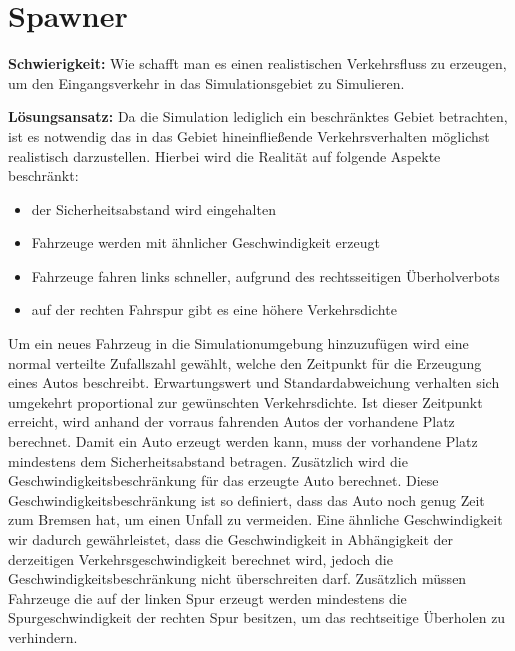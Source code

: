 \section{Spawner}
\textbf{Schwierigkeit:} Wie schafft man es einen realistischen Verkehrsfluss zu erzeugen, um den Eingangsverkehr in das Simulationsgebiet zu Simulieren.
\begin{addmargin}[25pt]{0pt}
	\item \textbf{Lösungsansatz:} Da die Simulation lediglich ein beschränktes Gebiet betrachten, ist es notwendig das in das Gebiet hineinfließende Verkehrsverhalten möglichst realistisch darzustellen. Hierbei wird die Realität auf folgende Aspekte beschränkt: 
	\begin{itemize}
		\item der Sicherheitsabstand wird eingehalten
		\item Fahrzeuge werden mit ähnlicher Geschwindigkeit erzeugt
		\item Fahrzeuge fahren links schneller, aufgrund des rechtsseitigen Überholverbots
		\item auf der rechten Fahrspur gibt es eine höhere Verkehrsdichte
	\end{itemize}
	Um ein neues Fahrzeug in die Simulationumgebung hinzuzufügen wird eine normal verteilte Zufallszahl gewählt, welche den Zeitpunkt für die Erzeugung eines Autos beschreibt. Erwartungswert und Standardabweichung verhalten sich umgekehrt proportional zur gewünschten Verkehrsdichte. Ist dieser Zeitpunkt erreicht, wird anhand der vorraus fahrenden Autos der vorhandene Platz berechnet. Damit ein Auto erzeugt werden kann, muss der vorhandene Platz mindestens dem Sicherheitsabstand betragen. Zusätzlich wird die Geschwindigkeitsbeschränkung für das erzeugte Auto berechnet. Diese Geschwindigkeitsbeschränkung ist so definiert, dass das Auto noch genug Zeit zum Bremsen hat, um einen Unfall zu vermeiden. Eine ähnliche Geschwindigkeit wir dadurch gewährleistet, dass die Geschwindigkeit in Abhängigkeit der derzeitigen Verkehrsgeschwindigkeit berechnet wird, jedoch die Geschwindigkeitsbeschränkung nicht überschreiten darf. Zusätzlich müssen Fahrzeuge die auf der linken Spur erzeugt werden mindestens die Spurgeschwindigkeit der rechten Spur besitzen, um das rechtseitige Überholen zu verhindern.
	

\end{addmargin}
